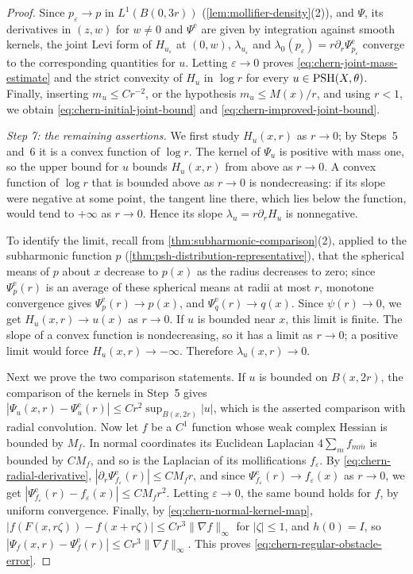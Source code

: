 \begin{proof}
Since $p_\varepsilon\to p$ in $L^1(B(0,3r))$ (\cref{lem:mollifier-density}(2)), and $\Psi$, its derivatives in $(z,w)$ for $w\neq0$ and $\Psi^{\mathrm e}$ are given by integration against smooth kernels, the joint Levi form of $H_{u_\varepsilon}$ at $(0,w)$, $\lambda_{u_\varepsilon}$ and $\lambda_0(p_\varepsilon)=r\partial_r\Psi^{\mathrm e}_{p_\varepsilon}$ converge to the corresponding quantities for $u$. Letting $\varepsilon\to0$ proves \eqref{eq:chern-joint-mass-estimate} and the strict convexity of $H_u$ in $\log r$ for every $u\in\mathrm{PSH}(X,\theta)$. Finally, inserting $m_u\leq Cr^{-2}$, or the hypothesis $m_u\leq M(x)/r$, and using $r<1$, we obtain \eqref{eq:chern-initial-joint-bound} and \eqref{eq:chern-improved-joint-bound}.

\emph{Step 7: the remaining assertions.} We first study $H_u(x,r)$ as $r\to0$; by Steps~5 and~6 it is a convex function of $\log r$. The kernel of $\Psi_u$ is positive with mass one, so the upper bound for $u$ bounds $H_u(x,r)$ from above as $r\to0$. A convex function of $\log r$ that is bounded above as $r\to0$ is nondecreasing: if its slope were negative at some point, the tangent line there, which lies below the function, would tend to $+\infty$ as $r\to0$. Hence its slope $\lambda_u=r\partial_rH_u$ is nonnegative.

To identify the limit, recall from \cref{thm:subharmonic-comparison}(2), applied to the subharmonic function $p$ (\cref{thm:psh-distribution-representative}), that the spherical means of $p$ about $x$ decrease to $p(x)$ as the radius decreases to zero; since $\Psi^{\mathrm e}_p(r)$ is an average of these spherical means at radii at most $r$, monotone convergence gives $\Psi^{\mathrm e}_p(r)\to p(x)$, and $\Psi^{\mathrm e}_q(r)\to q(x)$. Since $\psi(r)\to0$, we get $H_u(x,r)\to u(x)$ as $r\to0$. If $u$ is bounded near $x$, this limit is finite. The slope of a convex function is nondecreasing, so it has a limit as $r\to0$; a positive limit would force $H_u(x,r)\to-\infty$. Therefore $\lambda_u(x,r)\to0$.

Next we prove the two comparison statements. If $u$ is bounded on $B(x,2r)$, the comparison of the kernels in Step~5 gives $|\Psi_u(x,r)-\Psi^{\mathrm e}_u(r)|\leq Cr^2\sup_{B(x,2r)}|u|$, which is the asserted comparison with radial convolution. Now let $f$ be a $C^1$ function whose weak complex Hessian is bounded by $M_f$. In normal coordinates its Euclidean Laplacian $4\sum_mf_{m\bar m}$ is bounded by $CM_f$, and so is the Laplacian of its mollifications $f_\varepsilon$. By \eqref{eq:chern-radial-derivative}, $|\partial_r\Psi^{\mathrm e}_{f_\varepsilon}(r)|\leq CM_fr$, and since $\Psi^{\mathrm e}_{f_\varepsilon}(r)\to f_\varepsilon(x)$ as $r\to0$, we get $|\Psi^{\mathrm e}_{f_\varepsilon}(r)-f_\varepsilon(x)|\leq CM_fr^2$. Letting $\varepsilon\to0$, the same bound holds for $f$, by uniform convergence. Finally, by \eqref{eq:chern-normal-kernel-map}, $|f(F(x,r\zeta))-f(x+r\zeta)|\leq Cr^3\|\nabla f\|_\infty$ for $|\zeta|\leq1$, and $h(0)=I$, so $|\Psi_f(x,r)-\Psi^{\mathrm e}_f(r)|\leq Cr^3\|\nabla f\|_\infty$. This proves \eqref{eq:chern-regular-obstacle-error}.


\end{proof}
